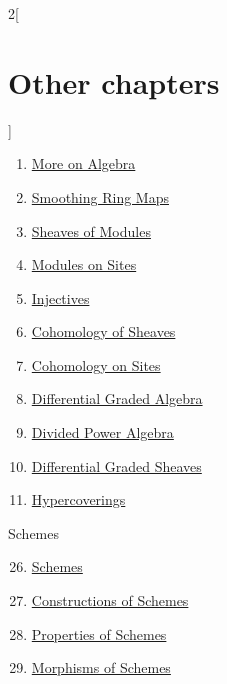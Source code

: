 \begin{multicols}{2}[\section{Other chapters}]
\begin{enumerate}
\item \href{https://github.com/stacks/stacks-project/blob/a04446e57ec1fbc252a871afcec7752fb2807b14/more-algebra.tex}{More on Algebra}
\item \href{https://github.com/stacks/stacks-project/blob/a04446e57ec1fbc252a871afcec7752fb2807b14/smoothing.tex}{Smoothing Ring Maps}
\item \href{https://github.com/stacks/stacks-project/blob/a04446e57ec1fbc252a871afcec7752fb2807b14/modules.tex}{Sheaves of Modules}
\item \href{https://github.com/stacks/stacks-project/blob/a04446e57ec1fbc252a871afcec7752fb2807b14/sites-modules.tex}{Modules on Sites}
\item \href{https://github.com/stacks/stacks-project/blob/a04446e57ec1fbc252a871afcec7752fb2807b14/injectives.tex}{Injectives}
\item \href{https://github.com/stacks/stacks-project/blob/a04446e57ec1fbc252a871afcec7752fb2807b14/cohomology.tex}{Cohomology of Sheaves}
\item \href{https://github.com/stacks/stacks-project/blob/a04446e57ec1fbc252a871afcec7752fb2807b14/sites-cohomology.tex}{Cohomology on Sites}
\item \href{https://github.com/stacks/stacks-project/blob/a04446e57ec1fbc252a871afcec7752fb2807b14/dga.tex}{Differential Graded Algebra}
\item \href{https://github.com/stacks/stacks-project/blob/a04446e57ec1fbc252a871afcec7752fb2807b14/dpa.tex}{Divided Power Algebra}
\item \href{https://github.com/stacks/stacks-project/blob/a04446e57ec1fbc252a871afcec7752fb2807b14/sdga.tex}{Differential Graded Sheaves}
\item \href{https://github.com/stacks/stacks-project/blob/a04446e57ec1fbc252a871afcec7752fb2807b14/hypercovering.tex}{Hypercoverings}
\end{enumerate}
Schemes
\begin{enumerate}
\setcounter{enumi}{25}
\item \href{https://github.com/stacks/stacks-project/blob/a04446e57ec1fbc252a871afcec7752fb2807b14/schemes.tex}{Schemes}
\item \href{https://github.com/stacks/stacks-project/blob/a04446e57ec1fbc252a871afcec7752fb2807b14/constructions.tex}{Constructions of Schemes}
\item \href{https://github.com/stacks/stacks-project/blob/a04446e57ec1fbc252a871afcec7752fb2807b14/properties.tex}{Properties of Schemes}
\item \href{https://github.com/stacks/stacks-project/blob/a04446e57ec1fbc252a871afcec7752fb2807b14/morphisms.tex}{Morphisms of Schemes}

\end{enumerate}
\end{multicols}
